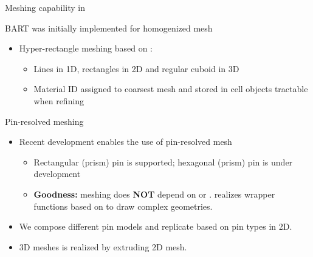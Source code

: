 \begin{frame}{Meshing capability in }
	\begin{block}{BART was initially implemented for homogenized mesh}
		\begin{itemize}
			\item Hyper-rectangle meshing based on :
			\begin{itemize}
				\item Lines in 1D, rectangles in 2D and regular cuboid in 3D
				\item Material ID assigned to coarsest mesh and stored in cell objects tractable when refining
			\end{itemize}
		\end{itemize}
	\end{block}
	\begin{block}{Pin-resolved meshing}
		\begin{itemize}
			\item Recent development enables the use of pin-resolved mesh
			\begin{itemize}
				\item Rectangular (prism) pin is supported; hexagonal (prism) pin is under development
				\item {\bf Goodness:} meshing does {\bf NOT} depend on  or .  realizes wrapper functions based on  to draw complex geometries.
			\end{itemize}
			\item We compose different pin models and replicate based on pin types in 2D.
			\item 3D meshes is realized by extruding 2D mesh.
		\end{itemize}
	\end{block}
\end{frame}

